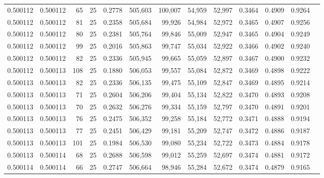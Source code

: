 \begin{tabular}{rrrrrrrrrrrrr}
0.500112 & 0.500112 &    65 &  25 &                                     0.2778 & 505,603 & 100,007 &  54,959 &  52,997 & 0.3464 & 0.4909 & 0.9264 \\
0.500112 & 0.500112 &    81 &  25 &                                     0.2358 & 505,684 &  99,926 &  54,984 &  52,972 & 0.3465 & 0.4907 & 0.9256 \\
0.500112 & 0.500112 &    80 &  25 &                                     0.2381 & 505,764 &  99,846 &  55,009 &  52,947 & 0.3465 & 0.4904 & 0.9249 \\
0.500112 & 0.500112 &    99 &  25 &                                     0.2016 & 505,863 &  99,747 &  55,034 &  52,922 & 0.3466 & 0.4902 & 0.9240 \\
0.500112 & 0.500112 &    82 &  25 &                                     0.2336 & 505,945 &  99,665 &  55,059 &  52,897 & 0.3467 & 0.4900 & 0.9232 \\
0.500112 & 0.500113 &   108 &  25 &                                     0.1880 & 506,053 &  99,557 &  55,084 &  52,872 & 0.3469 & 0.4898 & 0.9222 \\
0.500113 & 0.500113 &    82 &  25 &                                     0.2336 & 506,135 &  99,475 &  55,109 &  52,847 & 0.3469 & 0.4895 & 0.9214 \\
0.500113 & 0.500113 &    71 &  25 &                                     0.2604 & 506,206 &  99,404 &  55,134 &  52,822 & 0.3470 & 0.4893 & 0.9208 \\
0.500113 & 0.500113 &    70 &  25 &                                     0.2632 & 506,276 &  99,334 &  55,159 &  52,797 & 0.3470 & 0.4891 & 0.9201 \\
0.500113 & 0.500113 &    76 &  25 &                                     0.2475 & 506,352 &  99,258 &  55,184 &  52,772 & 0.3471 & 0.4888 & 0.9194 \\
0.500113 & 0.500113 &    77 &  25 &                                     0.2451 & 506,429 &  99,181 &  55,209 &  52,747 & 0.3472 & 0.4886 & 0.9187 \\
0.500113 & 0.500113 &   101 &  25 &                                     0.1984 & 506,530 &  99,080 &  55,234 &  52,722 & 0.3473 & 0.4884 & 0.9178 \\
0.500113 & 0.500114 &    68 &  25 &                                     0.2688 & 506,598 &  99,012 &  55,259 &  52,697 & 0.3474 & 0.4881 & 0.9172 \\
0.500114 & 0.500114 &    66 &  25 &                                     0.2747 & 506,664 &  98,946 &  55,284 &  52,672 & 0.3474 & 0.4879 & 0.9165 \\

\end{tabular}
